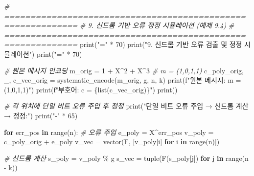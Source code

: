 \documentclass[
  oneside]{article}
\newenvironment{Shaded}{}{}
\newcommand{\BuiltInTok}[1]{\textcolor[rgb]{0.00,0.50,0.00}{#1}}
\newcommand{\CommentTok}[1]{\textcolor[rgb]{0.38,0.63,0.69}{\textit{#1}}}
\newcommand{\ControlFlowTok}[1]{\textcolor[rgb]{0.00,0.44,0.13}{\textbf{#1}}}
\newcommand{\DecValTok}[1]{\textcolor[rgb]{0.25,0.63,0.44}{#1}}
\newcommand{\KeywordTok}[1]{\textcolor[rgb]{0.00,0.44,0.13}{\textbf{#1}}}
\newcommand{\NormalTok}[1]{#1}
\newcommand{\OperatorTok}[1]{\textcolor[rgb]{0.40,0.40,0.40}{#1}}
\newcommand{\SpecialCharTok}[1]{\textcolor[rgb]{0.25,0.44,0.63}{#1}}
\newcommand{\SpecialStringTok}[1]{\textcolor[rgb]{0.73,0.40,0.53}{#1}}
\newcommand{\StringTok}[1]{\textcolor[rgb]{0.25,0.44,0.63}{#1}}
\begin{document}
\begin{Shaded}
\begin{Highlighting}[]
\CommentTok{\# ============================================================}
\CommentTok{\# 9. 신드롬 기반 오류 정정 시뮬레이션 (예제 9.4)}
\CommentTok{\# ============================================================}
\BuiltInTok{print}\NormalTok{(}\StringTok{"="} \OperatorTok{*} \DecValTok{70}\NormalTok{)}
\BuiltInTok{print}\NormalTok{(}\StringTok{"9. 신드롬 기반 오류 검출 및 정정 시뮬레이션"}\NormalTok{)}
\BuiltInTok{print}\NormalTok{(}\StringTok{"="} \OperatorTok{*} \DecValTok{70}\NormalTok{)}

\CommentTok{\# 원본 메시지 인코딩}
\NormalTok{m\_orig }\OperatorTok{=} \DecValTok{1} \OperatorTok{+}\NormalTok{ X}\OperatorTok{\^{}}\DecValTok{2} \OperatorTok{+}\NormalTok{ X}\OperatorTok{\^{}}\DecValTok{3}  \CommentTok{\# m = (1,0,1,1)}
\NormalTok{c\_poly\_orig, \_, c\_vec\_orig }\OperatorTok{=}\NormalTok{ systematic\_encode(m\_orig, g, n, k)}
\BuiltInTok{print}\NormalTok{(}\SpecialStringTok{f"원본 메시지: m = (1,0,1,1)"}\NormalTok{)}
\BuiltInTok{print}\NormalTok{(}\SpecialStringTok{f"부호어:      c = }\SpecialCharTok{\{}\BuiltInTok{list}\NormalTok{(c\_vec\_orig)}\SpecialCharTok{\}}\SpecialStringTok{"}\NormalTok{)}
\BuiltInTok{print}\NormalTok{()}

\CommentTok{\# 각 위치에 단일 비트 오류 주입 후 정정}
\BuiltInTok{print}\NormalTok{(}\StringTok{"단일 비트 오류 주입 → 신드롬 계산 → 정정:"}\NormalTok{)}
\BuiltInTok{print}\NormalTok{(}\StringTok{"{-}"} \OperatorTok{*} \DecValTok{65}\NormalTok{)}

\ControlFlowTok{for}\NormalTok{ err\_pos }\KeywordTok{in} \BuiltInTok{range}\NormalTok{(n):}
    \CommentTok{\# 오류 주입}
\NormalTok{    e\_poly }\OperatorTok{=}\NormalTok{ X}\OperatorTok{\^{}}\NormalTok{err\_pos}
\NormalTok{    v\_poly }\OperatorTok{=}\NormalTok{ c\_poly\_orig }\OperatorTok{+}\NormalTok{ e\_poly}
\NormalTok{    v\_vec }\OperatorTok{=}\NormalTok{ vector(F, [v\_poly[i] }\ControlFlowTok{for}\NormalTok{ i }\KeywordTok{in} \BuiltInTok{range}\NormalTok{(n)])}

    \CommentTok{\# 신드롬 계산}
\NormalTok{    s\_poly }\OperatorTok{=}\NormalTok{ v\_poly }\OperatorTok{\%}\NormalTok{ g}
\NormalTok{    s\_vec }\OperatorTok{=} \BuiltInTok{tuple}\NormalTok{(F(s\_poly[j]) }\ControlFlowTok{for}\NormalTok{ j }\KeywordTok{in} \BuiltInTok{range}\NormalTok{(n }\OperatorTok{{-}}\NormalTok{ k))}


\end{Highlighting}
\end{Shaded}
\end{document}
